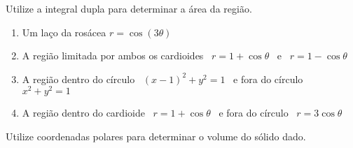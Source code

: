 	\vspace{5mm}
	
	Utilize a integral dupla para determinar a área da região.
	
	\begin{enumerate}[resume]
	
		\item Um laço da rosácea $r = \cos(3\theta)$
		
		\item A região limitada por ambos os cardioides \, $r = 1 + \cos\theta$ \, e \, $r = 1 - \cos\theta$
		
		\item A região dentro do círculo \, $(x-1)^2 + y^2 = 1$ \, e fora do círculo \, $x^2 + y^2 = 1$
		
		\item A região dentro do cardioide \, $r = 1 + \cos\theta$ \, e fora do círculo \, $r = 3\cos\theta$
	
	\end{enumerate}
	
	\vspace{5mm}
	
	Utilize coordenadas polares para determinar o volume do sólido dado.
	
